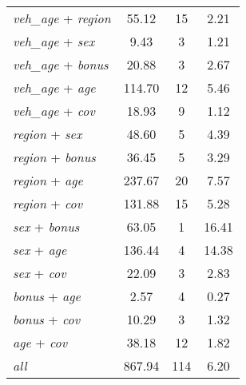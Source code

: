 {\begin{ThreePartTable}
\begin{longtable}{lccc}
    \textit{veh\_age} + \textit{region} &    55.12 &       15 &     2.21 \\
    \textit{veh\_age} + \textit{sex} &     9.43 &        3 &     1.21 \\
    \textit{veh\_age} + \textit{bonus} &    20.88 &        3 &     2.67 \\
    \textit{veh\_age} + \textit{age} &   114.70 &       12 &     5.46 \\
    \textit{veh\_age} + \textit{cov} &    18.93 &        9 &     1.12 \\
    \textit{region} + \textit{sex} &    48.60 &        5 &     4.39 \\
    \textit{region} + \textit{bonus} &    36.45 &        5 &     3.29 \\
    \textit{region} + \textit{age} &   237.67 &       20 &     7.57 \\
    \textit{region} + \textit{cov} &   131.88 &       15 &     5.28 \\
    \textit{sex} + \textit{bonus} &    63.05 &        1 &    16.41 \\
    \textit{sex} + \textit{age} &   136.44 &        4 &    14.38 \\
    \textit{sex} + \textit{cov} &    22.09 &        3 &     2.83 \\
    \textit{bonus} + \textit{age} &     2.57 &        4 &     0.27 \\
    \textit{bonus} + \textit{cov} &    10.29 &        3 &     1.32 \\
    \textit{age} + \textit{cov} &    38.18 &       12 &     1.82 \\
    \textit{all}\tnote{\ddag} &   867.94 &      114 &     6.20 \\

\end{longtable}
\end{ThreePartTable}
}
